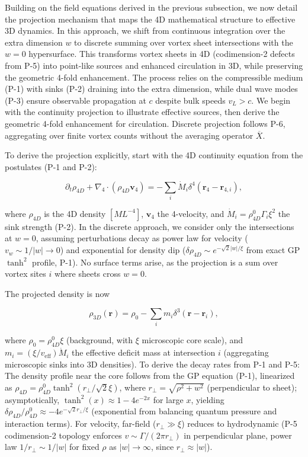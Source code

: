 Building on the field equations derived in the previous subsection, we now detail the projection mechanism that maps the 4D mathematical structure to effective 3D dynamics. In this approach, we shift from continuous integration over the extra dimension $w$ to discrete summing over vortex sheet intersections with the $w=0$ hypersurface. This transforms vortex sheets in 4D (codimension-2 defects from P-5) into point-like sources and enhanced circulation in 3D, while preserving the geometric 4-fold enhancement. The process relies on the compressible medium (P-1) with sinks (P-2) draining into the extra dimension, while dual wave modes (P-3) ensure observable propagation at $c$ despite bulk speeds $v_L > c$. We begin with the continuity projection to illustrate effective sources, then derive the geometric 4-fold enhancement for circulation. Discrete projection follows P-6, aggregating over finite vortex counts without the averaging operator $\overline{X}$.

To derive the projection explicitly, start with the 4D continuity equation from the postulates (P-1 and P-2):

\begin{equation}
\partial_t \rho_{4D} + \nabla_4 \cdot (\rho_{4D} \mathbf{v}_4) = -\sum_i \dot{M}_i \delta^4(\mathbf{r}_4 - \mathbf{r}_{4,i}),
\end{equation}

where $\rho_{4D}$ is the 4D density $[M L^{-4}]$, $\mathbf{v}_4$ the 4-velocity, and $\dot{M}_i = \rho_{4D}^0 \Gamma_i \xi^2$ the sink strength (P-2). In the discrete approach, we consider only the intersections at $w=0$, assuming perturbations decay as power law for velocity ($v_w \sim 1/|w| \to 0$) and exponential for density dip ($\delta \rho_{4D} \sim e^{-\sqrt{2} |w|/\xi}$ from exact GP $\tanh^2$ profile, P-1). No surface terms arise, as the projection is a sum over vortex sites $i$ where sheets cross $w=0$.

The projected density is now

\[
\rho_{3D}(\mathbf{r}) = \rho_0 - \sum_i m_i \delta^3(\mathbf{r} - \mathbf{r}_i),
\]

where $\rho_0 = \rho_{4D}^0 \xi$ (background, with $\xi$ microscopic core scale), and $m_i = (\xi / v_{\text{eff}}) \dot{M}_i$ the effective deficit mass at intersection $i$ (aggregating microscopic sinks into 3D densities). To derive the decay rates from P-1 and P-5: The density profile near the core follows from the GP equation (P-1), linearized as $\rho_{4D} = \rho_{4D}^0 \tanh^2 (r_\perp / \sqrt{2} \xi)$, where $r_\perp = \sqrt{\rho^2 + w^2}$ (perpendicular to sheet); asymptotically, $\tanh^2(x) \approx 1 - 4 e^{-2x}$ for large $x$, yielding $\delta \rho_{4D} / \rho_{4D}^0 \approx -4 e^{-\sqrt{2} r_\perp / \xi}$ (exponential from balancing quantum pressure and interaction terms). For velocity, far-field ($r_\perp \gg \xi$) reduces to hydrodynamic (P-5 codimension-2 topology enforces $v \sim \Gamma / (2\pi r_\perp)$ in perpendicular plane, power law $1/r_\perp \sim 1/|w|$ for fixed $\rho$ as $|w| \to \infty$, since $r_\perp \approx |w|$).

